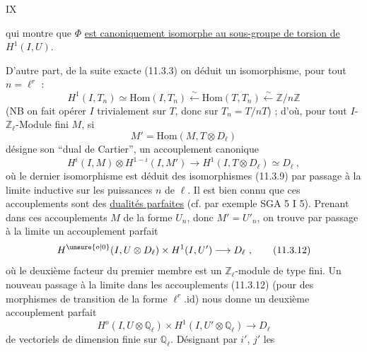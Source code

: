 \hfill IX

qui montre que $\Phi$ \uline{est canoniquement isomorphe au sous-groupe de torsion de} $H^1(I,U)$.

D'autre part, de la suite exacte (11.3.3) on déduit un isomorphisme, pour tout $n=\ell^r$ :
\[
 H^1(I,T_n)\simeq\mathrm{Hom}(I,T_n)\overset{\sim}{\longleftarrow}\mathrm{Hom}(T,T_n)\overset{\sim}{\longleftarrow}\mathbb Z/n\mathbb Z \tag*{(11.3.9)}
\]
(NB on fait opérer $I$ trivialement sur $T$, donc sur $T_n=T/nT$) ; d'où, pour tout $I$-$\mathbb Z_\ell$-Module fini $M$, si
\[
 M'=\mathrm{Hom}(M,T\otimes D_\ell) \tag*{(11.3.10)}
\]
désigne son ``dual de Cartier'', un accouplement canonique
\[
 H^i(I,M)\otimes H^{1-i}(I,M')\longrightarrow H^1(I,T\otimes D_\ell)\simeq D_\ell\ ,\tag*{(11.3.11)}
\]
où le dernier isomorphisme est déduit des isomorphismes (11.3.9) par passage à la limite inductive sur les puissances $n$ de $\ell$. Il est bien connu que ces accouplements sont des \uline{dualités parfaites} (cf. par exemple SGA 5 I 5). Prenant dans ces accouplements $M$ de la forme $U_n$, donc $M'=U'_n$, on trouve par passage à la limite un accouplement parfait
\[
 H^{\unsure{o|0}}(I,U\otimes D_\ell)\times H^1(I,U')\longrightarrow D_\ell\ ,\tag*{(11.3.12)}
\]
où le deuxième facteur du premier membre est un $\mathbb Z_\ell$-module de type fini. Un nouveau passage à la limite dans les accouplements (11.3.12) (pour des morphismes de transition de la forme $\ell^r.\mathrm{id}$) nous donne un deuxième accouplement parfait
\[
 H^o(I,U\otimes\mathbb Q_\ell)\times H^1(I,U'\otimes\mathbb Q_\ell)\longrightarrow D_\ell \tag*{(11.3.13)}
\]
de vectoriels de dimension finie sur $\mathbb Q_\ell$. Désignant par $i'$, $j'$ les

